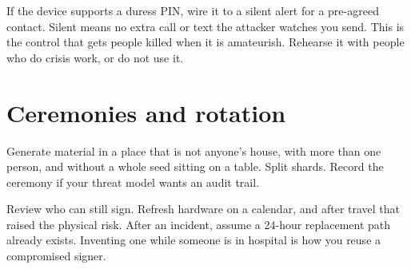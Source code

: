 If the device supports a duress PIN, wire it to a silent
alert for a pre-agreed contact. Silent means no extra
call or text the attacker watches you send. This is the
control that gets people killed when it is amateurish.
Rehearse it with people who do crisis work, or do not
use it.

\section{Ceremonies and rotation}

Generate material in a place that is not anyone's house,
with more than one person, and without a whole seed
sitting on a table. Split shards. Record the ceremony if
your threat model wants an audit trail.

Review who can still sign. Refresh hardware on a
calendar, and after travel that raised the physical
risk. After an incident, assume a 24-hour replacement
path already exists. Inventing one while someone is in
hospital is how you reuse a compromised signer.
